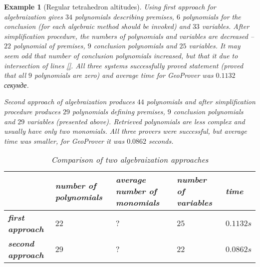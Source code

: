 \documentclass[final,1p,times,authoryear]{elsarticle}
\newtheorem{example}[theorem]{Example}
\begin{document}
\begin{example}[Regular tetrahedron altitudes]

Using first approach for algebraization gives $34$ polynomials
describing premises, $6$ polynomials for the conclusion (for each
algebraic method should be invoked) and $33$ variables. After
simplification procedure, the numbers of polynomials and variables are
decreased -- $22$ polynomial of premises, $9$ conclusion polynomials
and $25$ variables. It may seem odd that number of conclusion
polynomials increased, but that it due to intersection of lines
\ref{}. All three systems successfully proved statement (proved that
all $9$ polynomials are zero) and average time for GeoProver was
$0.1132$ секунде.

Second approach of algebraization produces $44$ polynomials and after
simplification procedure produces $29$ polynomials defining premises,
$9$ conclusion polynomials and $29$ variables (presented
above). Retrieved polynomials are less complex and usually have only
two monomials. All three provers were successful, but average time was
smaller, for GeoProver it was $0.0862$ seconds.

\begin{table}[!hb]
\begin{center}
\begin{tabular}{L{2cm}||R{2cm}|R{2cm}|R{2cm}|R{1.5cm}}
\                   &  number of polynomials & average number of monomials & number of variables & time \\
\hline
\hline
\textbf{first approach} & $22$ & $?$ & $25$ & $0.1132s$ \\
\hline
\textbf{second approach} & $29$ & $?$ & $22$ & $0.0862s$
\end{tabular}
\caption{Comparison of two algebraization approaches}
\end{center}
\end{table}

\end{example}
\end{document}
